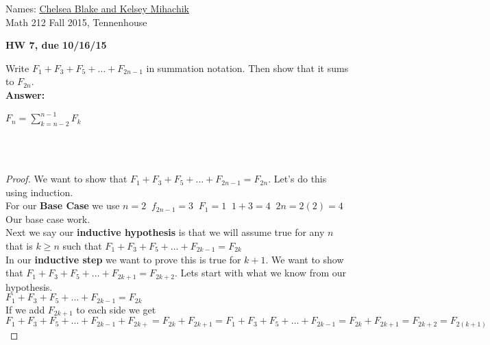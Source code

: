 \documentclass[12pt,letterpaper]{exam}
\begin{document}
\setlength{\pdfpageheight}{\paperheight}
\setlength{\pdfpagewidth}{\paperwidth}

\newcommand{\ud}{\,\mathrm{d}}
\pointsinmargin

Names: \underline{Chelsea Blake and Kelsey Mihachik\hspace{2in}}\\
Math 212 Fall 2015, Tennenhouse \\


\begin{center}
\textbf{HW 7, due 10/16/15}\\
\end{center}


\begin{questions}


\question[8,1]
Write $F_1+F_3+F_5+ \ldots +F_{2n-1}$ in summation notation. Then show that it sums to $F_{2n}$.
\\
\textbf{Answer:}
\\
\begin{center}
$F_n=\sum \limits_{k=n-2}^{n-1}F_k$
\end{center}
\\
\\
\begin{proof}
We want to show that $F_1+F_3+F_5+ \ldots +F_{2n-1}=F_{2n}$. Let's do this using induction.
\\
For our \textbf{Base Case} we use $n=2 \; \; f_{2n-1}=3 \; \; F_1=1 \; \; 1+3=4 \; \; 2n=2(2)=4$ Our base case work.
\\
Next we say our \textbf{inductive hypothesis} is that we will assume true for any $n$ that is $k \ge n$ such that $F_1+F_3+F_5+ \ldots +F_{2k-1}=F_{2k}$
\\
In our \textbf{inductive step} we want to prove this is true for $k+1$. We want to show that $F_1+F_3+F_5+ \ldots +F_{2k+1}=F_{2k+2}$. Lets start with what we know from our hypothesis.
\\
$F_1+F_3+F_5+ \ldots +F_{2k-1}=F_{2k}$
\\
If we add $F_{2k+1}$ to each side we get
\\
$F_1+F_3+F_5+ \ldots +F_{2k-1}+F_{2k+}=F_{2k}+F_{2k+1}=F_1+F_3+F_5+ \ldots +F_{2k-1}=F_{2k}+F_{2k+1}=F_{2k+2}=F_{2(k+1)}$ 
\end{proof}



\end{questions}
\end{document}
